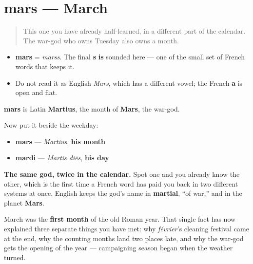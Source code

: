 \section[mars]{mars — March}

\label{lesson:FR-C09-mars}



\begin{quote}
This one you have already half-learned, in a different part of the calendar. The war-god who owns Tuesday also owns a month.
\end{quote}

\begin{sounds}
\begin{itemize}
\raggedright
  \item \textbf{mars} = \emph{marss}. The final \textbf{s} \textbf{is} sounded here — one of the small set of French words that keeps it.
  \item Do not read it as English \emph{Mars}, which has a different vowel; the French \textbf{a} is open and flat.
\end{itemize}
\end{sounds}

\begin{cousinweb}
\textbf{mars} is Latin \textbf{Martius}, the month of \textbf{Mars}, the war-god.

Now put it beside the weekday:

\begin{itemize}
\raggedright
  \item \textbf{mars} — \emph{Martius}, \textbf{his month}
  \item \textbf{mardi} — \emph{Martis diēs}, \textbf{his day}
\end{itemize}

\textbf{The same god, twice in the calendar.} Spot one and you already know the other, which is the first time a French word has paid you back in two different systems at once. English keeps the god's name in \textbf{martial}, \textquotedblleft{}of war,\textquotedblright{} and in the planet \textbf{Mars}.
\end{cousinweb}

\begin{culture}
March was the \textbf{first month} of the old Roman year. That single fact has now explained three separate things you have met: why \emph{février}'s cleaning festival came at the end, why the counting months land two places late, and why the war-god gets the opening of the year — campaigning season began when the weather turned.
\end{culture}

